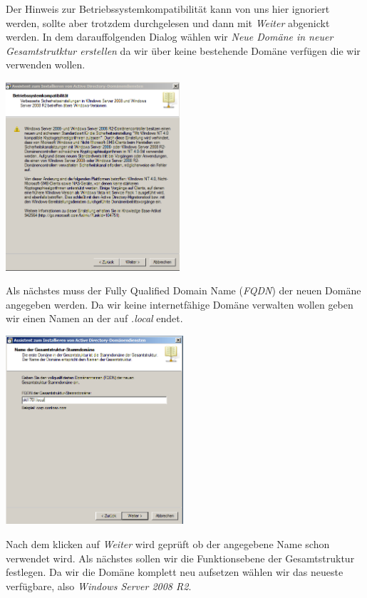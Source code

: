 \documentclass[12pt,a4paper,titlepage]{scrartcl} %
\begin{document}
Der Hinweis zur Betriebssystemkompatibilität kann von uns hier ignoriert werden, sollte aber trotzdem durchgelesen und dann mit \emph{Weiter} abgenickt werden. In dem darauffolgenden Dialog wählen wir \emph{Neue Domäne in neuer Gesamtstrutktur erstellen} da wir über keine bestehende Domäne verfügen die wir verwenden wollen.\\

	\begin{center}\includegraphics[height=7cm]{Bilder/015(dcpromo_exe02)}\\ \end{center}
	
Als nächstes muss der Fully Qualified Domain Name (\emph{FQDN}) der neuen Domäne angegeben werden. Da wir keine internetfähige Domäne verwalten wollen geben wir einen Namen an der auf \emph{.local} endet.\\

	\begin{center}\includegraphics[height=7cm]{Bilder/017(dcpromo_exe04)}\\ \end{center}
		
Nach dem klicken auf \emph{Weiter} wird geprüft ob der angegebene Name schon verwendet wird. Als nächstes sollen wir die Funktionsebene der Gesamtstruktur festlegen. Da wir die Domäne komplett neu aufsetzen wählen wir das neueste verfügbare, also \emph{Windows Server 2008 R2}.\\
\end{document}
